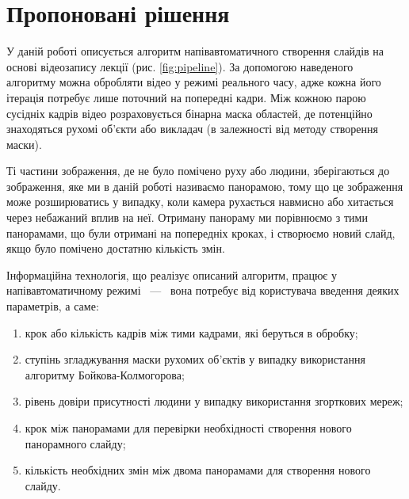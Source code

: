 \section{Пропоновані рішення}


У даній роботі описується алгоритм напівавтоматичного
створення слайдів на основі відеозапису лекції (рис. \ref{fig:pipeline}).
За допомогою наведеного алгоритму можна обробляти відео
у режимі реального часу, адже кожна його ітерація потребує
лише поточний на попередні кадри. Між кожною парою
сусідніх кадрів відео розраховується бінарна маска областей, де
потенційно знаходяться рухомі об'єкти або викладач
(в залежності від методу створення маски).

Ті частини зображення, де не було помічено руху або людини,
зберігаються до зображення, яке ми в даній роботі називаємо панорамою, тому що
це зображення може розширюватись у випадку, коли камера рухається
навмисно або хитається через небажаний вплив на неї.
Отриману панораму ми порівнюємо з тими панорамами, що були отримані на
попередніх кроках, і створюємо новий слайд, якщо було помічено
достатню кількість змін.

Інформаційна технологія, що реалізує описаний алгоритм, працює у
напівавтоматичному режимі ~---~ вона потребує від користувача введення
деяких параметрів, а саме:
\begin{enumerate}
    \item крок або кількість кадрів між тими кадрами, які беруться в обробку;
    \item ступінь згладжування маски рухомих об'єктів у випадку використання алгоритму Бойкова-Колмогорова;
    \item рівень довіри присутності людини у випадку використання згорткових мереж;
    \item крок між панорамами для перевірки необхідності створення нового панорамного слайду;
    \item кількість необхідних змін між двома панорамами для створення нового слайду.
\end{enumerate}

